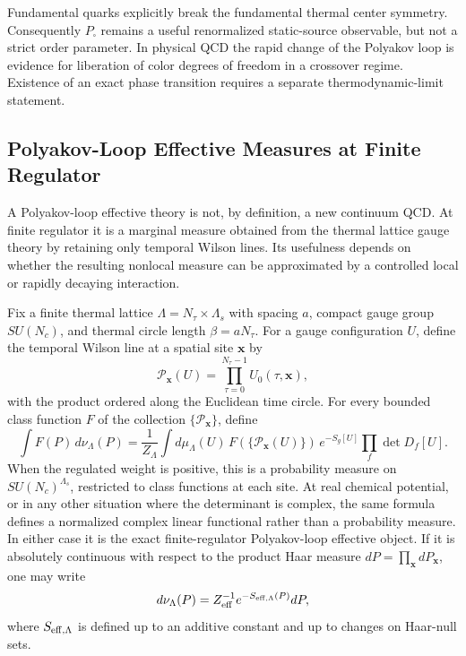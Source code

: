 \begin{remark}
\label{rem:qcd-dynamical-quarks-center}
Fundamental quarks explicitly break the fundamental thermal center symmetry.
Consequently \(P_\square\) remains a useful renormalized static-source
observable, but not a strict order parameter.  In physical QCD the rapid
change of the Polyakov loop is evidence for liberation of color degrees of
freedom in a crossover regime.  Existence of an exact phase transition
requires a separate thermodynamic-limit statement.
\end{remark}

\subsection{Polyakov-Loop Effective Measures at Finite Regulator}
\label{sec:qcd-polyakov-loop-effective-measures}

A Polyakov-loop effective theory is not, by definition, a new continuum QCD.
At finite regulator it is a marginal measure obtained from the thermal
lattice gauge theory by retaining only temporal Wilson lines.  Its usefulness
depends on whether the resulting nonlocal measure can be approximated by a
controlled local or rapidly decaying interaction.

\begin{definition}
\label{def:qcd-polyakov-loop-effective-measure}
Fix a finite thermal lattice
\(\Lambda=N_\tau\times\Lambda_s\) with spacing \(a\), compact gauge group
\(SU(N_c)\), and thermal circle length \(\beta=aN_\tau\).  For a gauge
configuration \(U\), define the temporal Wilson line at a spatial site
\(\mathbf x\) by
\[
  \mathcal P_{\mathbf x}(U)
  =
  \prod_{\tau=0}^{N_\tau-1}U_0(\tau,\mathbf x),
\]
with the product ordered along the Euclidean time circle.  For every bounded
class function \(F\) of the collection \(\{\mathcal P_{\mathbf x}\}\), define
\[
  \int F(P)\,d\nu_{\Lambda}(P)
  =
  \frac{1}{Z_{\Lambda}}
  \int d\mu_{\Lambda}(U)\,
  F(\{\mathcal P_{\mathbf x}(U)\})\,
  e^{-S_g[U]}\prod_f\det D_f[U].
\]
When the regulated weight is positive, this is a probability measure on
\(SU(N_c)^{\Lambda_s}\), restricted to class functions at each site.  At
real chemical potential, or in any other situation where the determinant is
complex, the same formula defines a normalized complex linear functional
rather than a probability measure.  In either case it is the exact
finite-regulator Polyakov-loop effective object.  If it is absolutely
continuous with
respect to the product Haar measure \(dP=\prod_{\mathbf x}dP_{\mathbf x}\),
one may write
\[
  d\nu_{\Lambda}(P)=Z_{\rm eff}^{-1}e^{-S_{\rm eff,\Lambda}(P)}dP,
\]
where \(S_{\rm eff,\Lambda}\) is defined up to an additive constant and up
to changes on Haar-null sets.
\end{definition}

